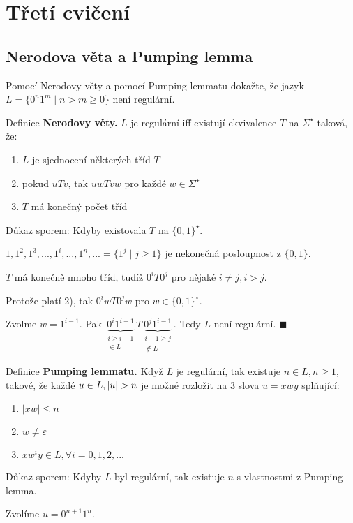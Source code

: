 \section{Třetí cvičení}

\subsection{Nerodova věta a Pumping lemma}
Pomocí Nerodovy věty a pomocí Pumping lemmatu dokažte, že jazyk $L = \{0^n 1^m \mid n > m \geq 0\}$ není regulární.

\noindent
Definice \textbf{Nerodovy věty.} $L$ je regulární iff existují ekvivalence $T$ na $\Sigma^\star$ taková, že:
\begin{enumerate}[1), noitemsep]
    \item $L$ je sjednocení některých tříd $T$
    \item pokud $uTv$, tak $uwTvw$ pro každé $w \in \Sigma^\star$
    \item $T$ má konečný počet tříd
\end{enumerate}
Důkaz sporem:
Kdyby existovala $T$ na $\{0,1\}^\star$.

$1, 1^2, 1^3, ..., 1^i, ..., 1^n, ... = \{1^j \mid j \geq 1\}$ je nekonečná posloupnost z $\{0,1\}$.

$T$ má konečně mnoho tříd, tudíž $0^i T 0^j$ pro nějaké $i \not= j, i>j$.

Protože platí 2), tak $0^i w T 0^j w$ pro $w \in \{0,1\}^\star$.

Zvolme $w = 1^{i-1}$. Pak $\underbrace{0^i 1^{i-1}}_{\substack{i \geq i-1 \\ \in L}} T 
\underbrace{0^j 1^{i-1}}_{\substack{i-1 \geq j  \\\not\in L }}$. Tedy $L$ není regulární. $\blacksquare$

\noindent
Definice \textbf{Pumping lemmatu.} Když $L$ je regulární, tak existuje $n \in L, n \geq 1$, takové, že každé ${u \in L},\\
|u| > n$ je 
možné rozložit na 3 slova $u = xwy$ splňující:
\begin{enumerate}[1), noitemsep]
    \item $|xw| \leq n$
    \item $w \not= \varepsilon$
    \item $xw^i y \in L, \forall i = 0, 1, 2, ...$
\end{enumerate}
Důkaz sporem:
Kdyby $L$ byl regulární, tak existuje $n$ s vlastnostmi z Pumping lemma.

Zvolíme $u = 0^{n+1} 1^n$.

